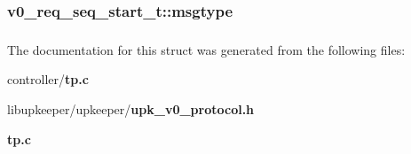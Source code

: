 \subsubsection[{msgtype}]{ {\bf v0\_\-req\_\-seq\_\-start\_\-t::msgtype}}\label{structv0__req__seq__start__t_aa927ffe185f44f4df82df8a2af2058a6}
\subsubsection[{UPK\_\-V0\_\-UPK\_\-REQ\_\-SEQ\_\-START\_\-T\_\-FIELDS}]{}\label{structv0__req__seq__start__t_a43d6cb1c655a3c707a1a089cd952c2ed}


The documentation for this struct was generated from the following files:\begin{DoxyCompactItemize}
\item 
controller/{\bf tp.c}\item 
libupkeeper/upkeeper/{\bf upk\_\-v0\_\-protocol.h}\item 
{\bf tp.c}\end{DoxyCompactItemize}
